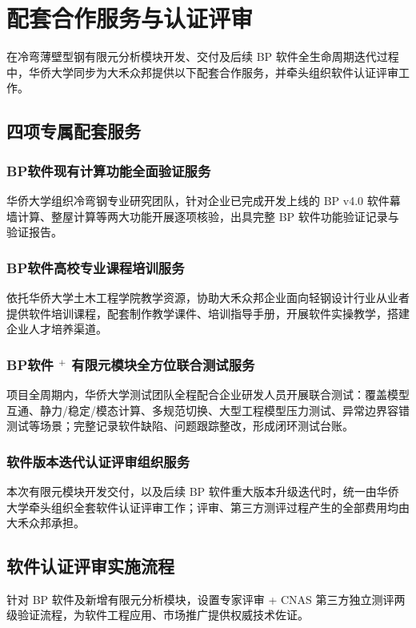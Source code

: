 \section{配套合作服务与认证评审}

在冷弯薄壁型钢有限元分析模块开发、交付及后续 BP 软件全生命周期迭代过程中，华侨大学同步为大禾众邦提供以下配套合作服务，并牵头组织软件认证评审工作。

\subsection{四项专属配套服务}

\subsubsection{BP软件现有计算功能全面验证服务}
华侨大学组织冷弯钢专业研究团队，针对企业已完成开发上线的 BP v4.0 软件幕墙计算、整屋计算等两大功能开展逐项核验，出具完整 BP 软件功能验证记录与验证报告。

\subsubsection{BP软件高校专业课程培训服务}
依托华侨大学土木工程学院教学资源，协助大禾众邦企业面向轻钢设计行业从业者提供软件培训课程，配套制作教学课件、培训指导手册，开展软件实操教学，搭建企业人才培养渠道。

\subsubsection{BP软件 \(^+\) 有限元模块全方位联合测试服务}
项目全周期内，华侨大学测试团队全程配合企业研发人员开展联合测试：覆盖模型互通、静力/稳定/模态计算、多规范切换、大型工程模型压力测试、异常边界容错测试等场景；完整记录软件缺陷、问题跟踪整改，形成闭环测试台账。

\subsubsection{软件版本迭代认证评审组织服务}
本次有限元模块开发交付，以及后续 BP 软件重大版本升级迭代时，统一由华侨大学牵头组织全套软件认证评审工作；评审、第三方测评过程产生的全部费用均由大禾众邦承担。

\subsection{软件认证评审实施流程}
针对 BP 软件及新增有限元分析模块，设置专家评审 + CNAS 第三方独立测评两级验证流程，为软件工程应用、市场推广提供权威技术佐证。

